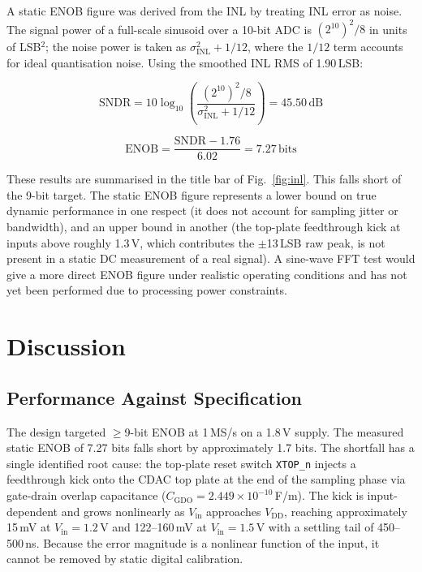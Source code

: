 \documentclass[12pt, a4paper]{article}
\begin{document}
A static ENOB figure was derived from the INL by treating INL error as noise. The signal power of a full-scale sinusoid over a 10-bit ADC is $(2^{10})^2/8$ in units of LSB$^2$; the noise power is taken as $\sigma_{\mathrm{INL}}^2 + 1/12$, where the $1/12$ term accounts for ideal quantisation noise. Using the smoothed INL RMS of 1.90\,LSB:

\begin{equation}
    \mathrm{SNDR} = 10\log_{10}\!\left(\frac{(2^{10})^2/8}{\sigma_{\mathrm{INL}}^2 + 1/12}\right) = 45.50\,\mathrm{dB}
\end{equation}

\begin{equation}
    \mathrm{ENOB} = \frac{\mathrm{SNDR} - 1.76}{6.02} = 7.27\,\mathrm{bits}
\end{equation}

These results are summarised in the title bar of Fig.~\ref{fig:inl}. This falls short of the 9-bit target. The static ENOB figure represents a lower bound on true dynamic performance in one respect (it does not account for sampling jitter or bandwidth), and an upper bound in another (the top-plate feedthrough kick at inputs above roughly 1.3\,V, which contributes the $\pm$13\,LSB raw peak, is not present in a static DC measurement of a real signal). A sine-wave FFT test would give a more direct ENOB figure under realistic operating conditions and has not yet been performed due to processing power constraints.

\section{Discussion}
\label{section:discussion}

\subsection{Performance Against Specification}

The design targeted $\geq$9-bit ENOB at 1\,MS/s on a 1.8\,V supply. The measured static ENOB of 7.27 bits falls short by approximately 1.7 bits. The shortfall has a single identified root cause: the top-plate reset switch \texttt{XTOP\_n} injects a feedthrough kick onto the CDAC top plate at the end of the sampling phase via gate-drain overlap capacitance ($C_\mathrm{GDO} = 2.449 \times 10^{-10}$\,F/m). The kick is input-dependent and grows nonlinearly as $V_\mathrm{in}$ approaches $V_\mathrm{DD}$, reaching approximately 15\,mV at $V_\mathrm{in} = 1.2$\,V and 122--160\,mV at $V_\mathrm{in} = 1.5$\,V with a settling tail of 450--500\,ns. Because the error magnitude is a nonlinear function of the input, it cannot be removed by static digital calibration.
\end{document}

